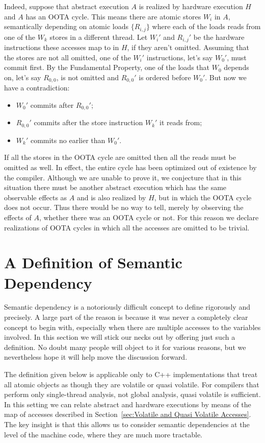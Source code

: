 \documentclass[10]{article}
\begin{document}
Indeed, suppose that abstract execution $A$ is realized by hardware
execution $H$ and $A$ has an OOTA cycle.
This means there are atomic stores $W_i$ in $A$,
semantically depending on atomic loads
$\{R_{i,j}\}$ where each of the loads reads from one of the $W_k$
stores in a different thread.
Let $W_i'$ and $R_{i,j}'$ be the hardware instructions these accesses
map to in $H$, if they aren't omitted.
Assuming that the stores are not all omitted,
one of the $W_i'$ instructions, let's say $W_0'$, must commit first.
By the Fundamental Property, one of the loads that $W_0$ depends on,
let's say $R_{0,0}$, is not omitted and $R_{0,0}'$ is ordered before $W_0'$.
But now we have a contradiction:
\begin{itemize}
\item	$W_0'$ commits after $R_{0,0}'$;
\item	$R_{0,0}'$ commits after the store instruction $W_k'$ it reads from;
\item	$W_k'$ commits no earlier than $W_0'$.
\end{itemize}

If all the stores in the OOTA cycle are omitted then all the reads
must be omitted as well.
In effect, the entire cycle has been optimized
out of existence by the compiler.
Although we are unable to prove it, we conjecture that in this
situation there must be another abstract execution which has the
same observable effects as $A$ and is also realized by $H$, but in
which the OOTA cycle does not occur.
Thus there would be no way to tell, merely by observing the effects of
$A$, whether there was an OOTA cycle or not.
For this reason we declare realizations of OOTA cycles in which
all the accesses are omitted to be trivial.

\section{A Definition of Semantic Dependency}
\label{sec:A Definition of Semantic Dependency}

Semantic dependency is a notoriously difficult concept to define
rigorously and precisely.
A large part of the reason is because it was never a completely clear
concept to begin with, especially when there are multiple accesses to
the variables involved.
In this section we will stick our necks out by offering just such a
definition.
No doubt many people will object to it for various reasons, but we
nevertheless hope it will help move the discussion forward.

The definition given below is applicable only to C++ implementations
that treat all atomic objects as though they are volatile or
quasi volatile.
For compilers that perform only single-thread analysis, not global
analysis, quasi volatile is sufficient.
In this setting we can relate abstract and hardware executions by
means of the map of accesses described in
Section~\ref{sec:Volatile and Quasi Volatile Accesses}.
The key insight is that this allows us to consider semantic
dependencies at the level of the machine code, where they are much
more tractable.
\end{document}
